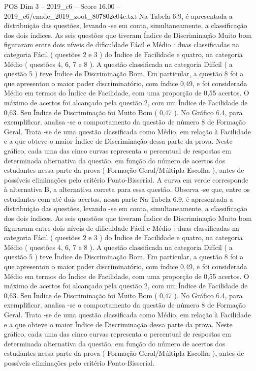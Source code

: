 \begin{textsample}{POS Dim 3 – 2019\_c6 – Score 16.00 – 2019\_c6/enade\_2019\_zoot\_807802c04e.txt}
Na Tabela 6.9, é apresentada a distribuição das questões, levando -se em conta, simultaneamente, a classificação dos dois índices.
As seis questões que tiveram Índice de Discriminação Muito bom figuraram entre dois níveis de dificuldade Fácil e Médio : duas classificadas na categoria Fácil ( questões 2 e 3 ) do Índice de Facilidade e quatro, na categoria Médio ( questões 4, 6, 7 e 8 ).
A questão classificada na categoria Difícil ( a questão 5 ) teve Índice de Discriminação Bom.
Em particular, a questão 8 foi a que apresentou o maior poder discriminatório, com índice 0,49, e foi considerada Médio em termos do Índice de Facilidade, com uma proporção de 0,55 acertos.
O máximo de acertos foi alcançado pela questão 2, com um Índice de Facilidade de 0,63.
Seu Índice de Discriminação foi Muito Bom ( 0,47 ).
No Gráfico 6.4, para exemplificar, analisa -se o comportamento da questão de número 8 de Formação Geral.
Trata -se de uma questão classificada como Médio, em relação à Facilidade e a que obteve o maior Índice de Discriminação dessa parte da prova.
Neste gráfico, cada uma das cinco curvas representa o percentual de respostas em determinada alternativa da questão, em função do número de acertos dos estudantes nessa parte da prova ( Formação Geral/Múltipla Escolha ), antes de possíveis eliminações pelo critério Ponto-Bisserial.
A curva em verde corresponde à alternativa B, a alternativa correta para essa questão.
Observa -se que, entre os estudantes com até dois acertos, nessa parte Na Tabela 6.9, é apresentada a distribuição das questões, levando -se em conta, simultaneamente, a classificação dos dois índices.
As seis questões que tiveram Índice de Discriminação Muito bom figuraram entre dois níveis de dificuldade Fácil e Médio : duas classificadas na categoria Fácil ( questões 2 e 3 ) do Índice de Facilidade e quatro, na categoria Médio ( questões 4, 6, 7 e 8 ).
A questão classificada na categoria Difícil ( a questão 5 ) teve Índice de Discriminação Bom.
Em particular, a questão 8 foi a que apresentou o maior poder discriminatório, com índice 0,49, e foi considerada Médio em termos do Índice de Facilidade, com uma proporção de 0,55 acertos.
O máximo de acertos foi alcançado pela questão 2, com um Índice de Facilidade de 0,63.
Seu Índice de Discriminação foi Muito Bom ( 0,47 ).
No Gráfico 6.4, para exemplificar, analisa -se o comportamento da questão de número 8 de Formação Geral.
Trata -se de uma questão classificada como Médio, em relação à Facilidade e a que obteve o maior Índice de Discriminação dessa parte da prova.
Neste gráfico, cada uma das cinco curvas representa o percentual de respostas em determinada alternativa da questão, em função do número de acertos dos estudantes nessa parte da prova ( Formação Geral/Múltipla Escolha ), antes de possíveis eliminações pelo critério Ponto-Bisserial.

\end{textsample}
